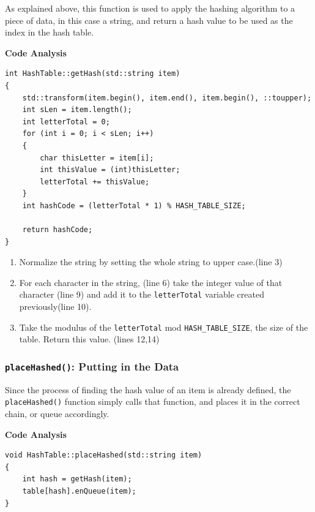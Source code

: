 \documentclass[letterpaper, 10pt]{article}
\begin{document}
As explained above, this function is used to apply the hashing algorithm to a piece of data, in this case a string, and return a hash value to be used as the index in the hash table.
\begin{center}
    \textbf{Code Analysis}
\end{center}
\begin{addmargin}[-5em]{1em}
\begin{small}
\begin{verbatim}
int HashTable::getHash(std::string item)
{
	std::transform(item.begin(), item.end(), item.begin(), ::toupper);
	int sLen = item.length();
	int letterTotal = 0;
	for (int i = 0; i < sLen; i++)
	{
		char thisLetter = item[i];
		int thisValue = (int)thisLetter;
		letterTotal += thisValue;
	}
	int hashCode = (letterTotal * 1) % HASH_TABLE_SIZE;

	return hashCode;
}
\end{verbatim}
\end{small}
\end{addmargin}

\begin{enumerate}
    \item Normalize the string by setting the whole string to upper case.(line 3)
    \item For each character in the string, (line 6) take the integer value of that character (line 9) and add it to the \texttt{letterTotal} variable created previously(line 10).
    \item Take the modulus of the \texttt{letterTotal} mod \texttt{HASH\_TABLE\_SIZE}, the size of the table. Return this value. (lines 12,14)
\end{enumerate}




\subsubsection{\texttt{placeHashed()}: Putting in the Data}

Since the process of finding the hash value of an item is already defined, the \texttt{placeHashed()} function simply calls that function, and places it in the correct chain, or queue accordingly.
\begin{center}
    \textbf{Code Analysis}
\end{center}
\begin{addmargin}[-5em]{1em}
\begin{small}
\begin{verbatim}
void HashTable::placeHashed(std::string item)
{
	int hash = getHash(item);
	table[hash].enQueue(item);
}
\end{verbatim}
\end{small}
\end{addmargin}
\end{document}
